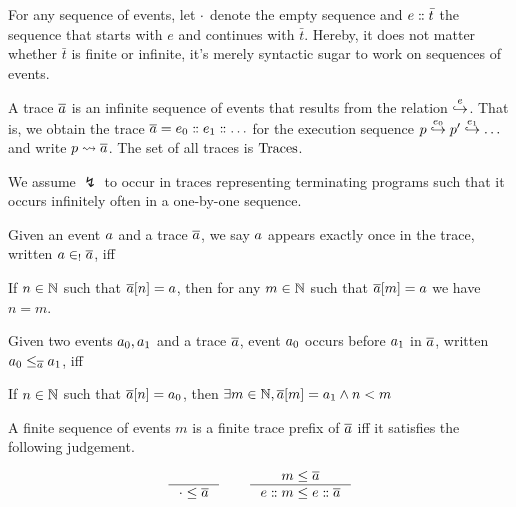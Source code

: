 %

\begin{definition}
  For any sequence of events, let $\seqnil$ denote the empty sequence and $\seqcons{e}{\bar{t}}$ the sequence that starts with $e$ and continues with $\bar{t}$.
  Hereby, it does not matter whether $\bar{t}$ is finite or infinite, it's merely syntactic sugar to work on sequences of events.
\end{definition}

\begin{definition}[Traces]
  A trace $\trace$ is an infinite sequence of events that results from the relation $\singlestep$.
  That is, we obtain the trace $\trace=\seqcons{e_{0}}{\seqcons{e_{1}}{\dots}}$ for the execution sequence $\estep{p}{e_{0}}{\estep{p'}{e_{1}}{\dots}}$ and write $\mktrace{p}{\trace}$.
  The set of all traces is $\traces$.
\end{definition}
\noindent
We assume $\lightning$ to occur in traces representing terminating programs such that it occurs infinitely often in a one-by-one sequence.

\begin{definition}[Once]
  Given an event $\event$ and a trace $\trace$, we say $\event$ appears exactly once in the trace, written $\event\in_{!}\trace$, iff

  If $n\in\nat$ such that $\trace{[n]}=\event$, then for any $m\in\nat$ such that $\trace{[m]}=\event$ we have $n = m$.
\end{definition}

\begin{definition}[Before]
  Given two events $\event[_0],\event[_1]$ and a trace $\trace$, event $\event[_0]$ occurs before $\event[_1]$ in $\trace$, written
  $\event{_0}\le_{\trace}\event{_1}$, iff

  If $n\in\nat$ such that $\trace{[n]} = \event[_{0}]$, then $\exists m\in\nat, \trace{[m]} = \event[_1] \wedge n< m$
\end{definition}


\begin{definition}
  A finite sequence of events $m$ is a finite trace prefix of $\trace$ iff it satisfies the following judgement.

  $$
    \inference{}{\cdot\le\trace}\hspace{2em}\inference{m\le\trace}{\seqcons{e}{m}\le \seqcons{e}{\trace}}
  $$
\end{definition}

